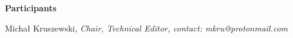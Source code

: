 \vspace*{5mm}

\textbf{\LARGE Participants}

\vspace*{5mm}

\begin{center}
Michał Kruszewski, \textit{Chair, Technical Editor, contact: mkru@protonmail.com}
\end{center}

\newpage
